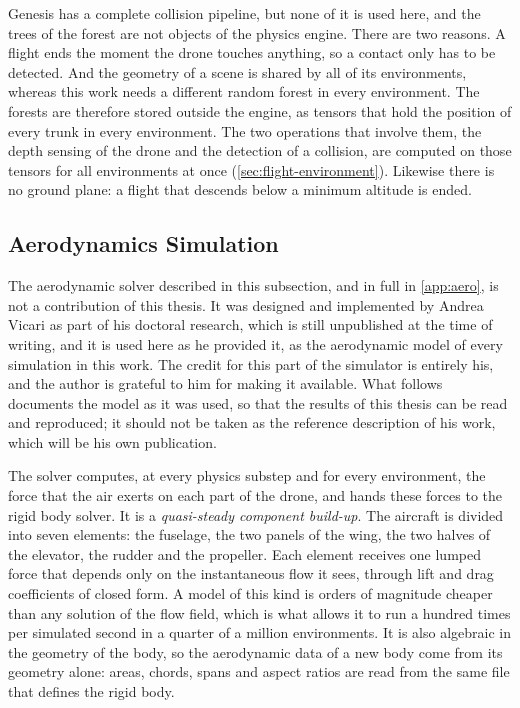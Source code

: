 Genesis has a complete collision pipeline, but none of it is used here, and the trees of the forest are not objects of the physics engine. There are two reasons. A flight ends the moment the drone touches anything, so a contact only has to be detected. And the geometry of a scene is shared by all of its environments, whereas this work needs a different random forest in every environment. The forests are therefore stored outside the engine, as tensors that hold the position of every trunk in every environment. The two operations that involve them, the depth sensing of the drone and the detection of a collision, are computed on those tensors for all environments at once (\autoref{sec:flight-environment}). Likewise there is no ground plane: a flight that descends below a minimum altitude is ended.

\subsection{Aerodynamics Simulation}
\label{subsec:genesis-aero}

The aerodynamic solver described in this subsection, and in full in \autoref{app:aero}, is not a contribution of this thesis. It was designed and implemented by Andrea Vicari as part of his doctoral research, which is still unpublished at the time of writing, and it is used here as he provided it, as the aerodynamic model of every simulation in this work. The credit for this part of the simulator is entirely his, and the author is grateful to him for making it available. What follows documents the model as it was used, so that the results of this thesis can be read and reproduced; it should not be taken as the reference description of his work, which will be his own publication.

The solver computes, at every physics substep and for every environment, the force that the air exerts on each part of the drone, and hands these forces to the rigid body solver. It is a \emph{quasi-steady component build-up}. The aircraft is divided into seven elements: the fuselage, the two panels of the wing, the two halves of the elevator, the rudder and the propeller. Each element receives one lumped force that depends only on the instantaneous flow it sees, through lift and drag coefficients of closed form. A model of this kind is orders of magnitude cheaper than any solution of the flow field, which is what allows it to run a hundred times per simulated second in a quarter of a million environments. It is also algebraic in the geometry of the body, so the aerodynamic data of a new body come from its geometry alone: areas, chords, spans and aspect ratios are read from the same file that defines the rigid body.

